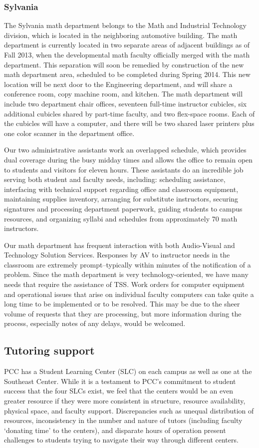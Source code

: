 \subsubsection{Sylvania}
The Sylvania math department belongs to the Math and Industrial Technology division, which is located in the neighboring automotive building.  The math department is currently located in two separate areas of adjacent buildings as of Fall 2013, when the developmental math faculty officially merged with the math department.  This separation will soon be remedied by construction of the new math department area, scheduled to be completed during Spring 2014.  This new location will be next door to the Engineering department, and will share a conference room, copy machine room, and kitchen. The math department will include two department chair offices, seventeen full-time instructor cubicles, six additional cubicles shared by part-time faculty, and two flex-space rooms. Each of the cubicles will have a computer, and there will be two shared laser printers plus one color scanner in the department office.

 Our two administrative assistants work an overlapped schedule, which provides dual coverage during the busy midday times and allows the office to remain open to students and visitors for eleven hours.  These assistants do an incredible job serving both student and faculty needs, including:  scheduling assistance, interfacing with technical support regarding office and classroom equipment, maintaining supplies inventory, arranging for substitute instructors, securing signatures and processing department paperwork, guiding students to campus resources, and organizing syllabi and schedules from approximately 70 math instructors.  

Our math department has frequent interaction with both Audio-Visual and Technology Solution Services.  Responses by AV to instructor needs in the classroom are extremely prompt--typically within minutes of the notification of a problem.  Since the math department is very technology-oriented, we have many needs that require the assistance of TSS.  Work orders for computer equipment and operational issues that arise on individual faculty computers can take quite a long time to be implemented or to be resolved.  This may be due to the sheer volume of requests that they are processing, but more information during the process, especially notes of any delays, would be welcomed.

\subsection{Tutoring support}
PCC has a Student Learning Center (SLC) on each campus as well as one at  the
Southeast Center.  While it is a testament to PCC's commitment to student
success that the four SLCs exist, we feel that the centers would be an even
greater resource if they were more consistent in structure, resource
availability, physical space, and faculty support.  Discrepancies such as
unequal distribution of resources, inconsistency in the number and nature of
tutors (including faculty `donating time' to the centers), and disparate hours
of operation present challenges to students trying to navigate their way
through different centers. 

